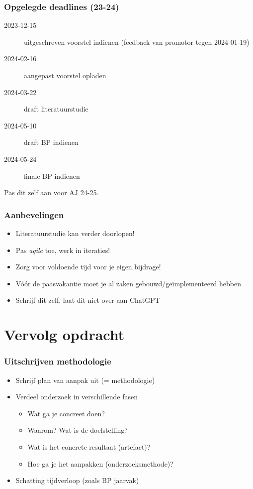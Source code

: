 \documentclass[aspectratio=169]{beamer}
\begin{document}
\begin{frame}
  \frametitle{Opgelegde deadlines (23-24)}

  \begin{description}
    \item[2023-12-15] uitgeschreven voorstel indienen (feedback van promotor tegen 2024-01-19)
    \item[2024-02-16] aangepast voorstel opladen
    \item[2024-03-22] draft literatuurstudie
    \item[2024-05-10] draft BP indienen
    \item[2024-05-24] finale BP indienen
  \end{description}

  \medskip

  Pas dit zelf aan voor AJ 24-25.

\end{frame}

\begin{frame}
  \frametitle{Aanbevelingen}

  \begin{itemize}
    \item Literatuurstudie kan verder doorlopen!
    \item Pas \textit{agile} toe, werk in iteraties!
    \item Zorg voor voldoende tijd voor je eigen bijdrage!
    \item Vóór de paasvakantie moet je al zaken gebouwd/geïmplementeerd hebben
    \item Schrijf dit zelf, laat dit niet over aan ChatGPT
  \end{itemize}

\end{frame}

\section{Vervolg opdracht}

\begin{frame}
  \frametitle{Uitschrijven methodologie}

  \begin{itemize}
    \item Schrijf plan van aanpak uit (= methodologie)
    \item Verdeel onderzoek in verschillende fasen
          \begin{itemize}
            \item Wat ga je concreet doen?
            \item Waarom? Wat is de doelstelling?
            \item Wat is het concrete resultaat (artefact)?
            \item Hoe ga je het aanpakken (onderzoeksmethode)?
          \end{itemize}
    \item Schatting tijdverloop (zoals BP jaarvak)
  \end{itemize}

\end{frame}
\end{document}
